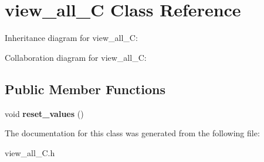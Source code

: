 \hypertarget{classview__all__C}{}\section{view\+\_\+all\+\_\+C Class Reference}
\label{classview__all__C}


Inheritance diagram for view\+\_\+all\+\_\+C\+:


Collaboration diagram for view\+\_\+all\+\_\+C\+:
\subsection*{Public Member Functions}
\begin{DoxyCompactItemize}
\item 
void {\bfseries reset\+\_\+values} ()\hypertarget{classview__all__C_abe41a3bdeb4e14d8a4a5b270d4e693ca}{}\label{classview__all__C_abe41a3bdeb4e14d8a4a5b270d4e693ca}

\end{DoxyCompactItemize}


The documentation for this class was generated from the following file\+:\begin{DoxyCompactItemize}
\item 
view\+\_\+all\+\_\+\+C.\+h\end{DoxyCompactItemize}
